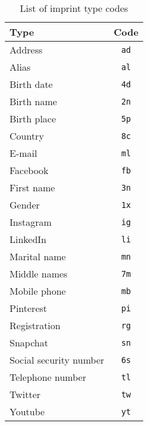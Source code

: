 \documentclass[twoside,twocolumn]{article}
\theoremstyle{definition}
\theoremstyle{remark}
\begin{document}
\begin{table}[htb]
    \centering
    \caption{List of imprint type codes}
    \begin{tabular*}{0.35\textwidth}{l|c}
        Type & Code \\
        \hline \hline
        Address & \texttt{ad} \\
        \hline
        Alias & \texttt{al} \\
        \hline
        Birth date & \texttt{4d} \\
        \hline
        Birth name & \texttt{2n} \\
        \hline
        Birth place & \texttt{5p} \\
        \hline
        Country & \texttt{8c} \\
        \hline
        E-mail & \texttt{ml} \\
        \hline
        Facebook & \texttt{fb} \\
        \hline
        First name & \texttt{3n} \\
        \hline
        Gender & \texttt{1x} \\
        \hline
        Instagram & \texttt{ig} \\
        \hline
        LinkedIn & \texttt{li} \\
        \hline
        Marital name & \texttt{mn} \\
        \hline
        Middle names & \texttt{7m} \\
        \hline
        Mobile phone & \texttt{mb} \\
        \hline
        Pinterest & \texttt{pi} \\
        \hline
        Registration & \texttt{rg} \\
        \hline
        Snapchat & \texttt{sn} \\
        \hline
        Social security number & \texttt{6s} \\
        \hline
        Telephone number & \texttt{tl} \\
        \hline
        Twitter & \texttt{tw} \\
        \hline
        Youtube & \texttt{yt}
        \label{table:empreintes}
    \end{tabular*}
\end{table}
\end{document}
